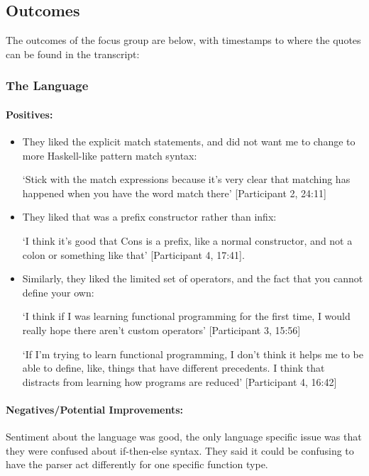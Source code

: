 \subsection{Outcomes}
The outcomes of the focus group are below, with timestamps to where the quotes can be found in the transcript: 
\subsubsection{The Language}
\paragraph{Positives:}
\begin{itemize}
    \item They liked the explicit match statements, and did not want me to change to more Haskell-like pattern match syntax: 
    
    `Stick with the match expressions because it's very clear that matching has happened when you have the word match there' [Participant 2, 24:11]
    \item They liked that  was a prefix constructor rather than infix: 
    
    `I think it's good that Cons is a prefix, like a normal constructor, and not a colon or
    something like that' [Participant 4, 17:41]. 
    \item Similarly, they liked the limited set of operators, and the fact that you cannot define your own: 
    
    `I think if I was learning functional programming for the first time, I would really hope there aren't custom operators' [Participant 3, 15:56]
    
    `If I'm trying to learn functional programming, I don't think it helps me to be able to define, like, things that have different precedents. I think that distracts from learning how programs are reduced' [Participant 4, 16:42]
\end{itemize}

\paragraph{Negatives/Potential Improvements:}
\label{ref:afg_ite} 
Sentiment about the language was good, the only language specific issue was that they were confused about if-then-else syntax. They said it could be confusing to have the parser act differently for one specific function type. 

